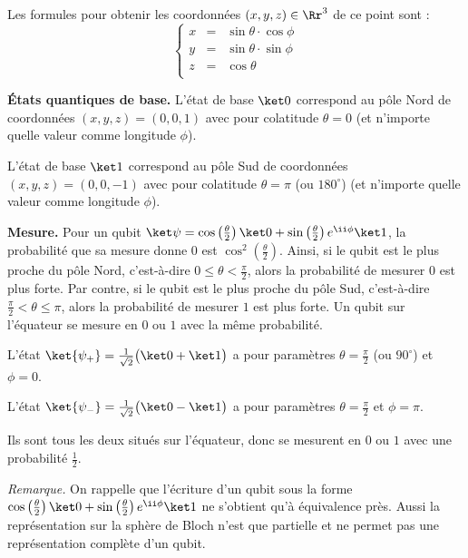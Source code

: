 \documentclass[11pt,class=report,crop=false]{standalone}
\renewcommand{\commentfigure}[1]{#1} %
\begin{document}
Les formules pour obtenir les coordonnées $(x,y,z)\in\Rr^3$ de ce point sont :
$$\left\{\begin{array}{rcl}
x &=& \sin\theta \cdot \cos\phi \\
y &=& \sin\theta \cdot \sin\phi \\
z &=& \cos\theta \\
\end{array}\right.$$


\bigskip
\textbf{États quantiques de base.}
L'état de base $\ket0$ correspond au pôle Nord de coordonnées $(x,y,z)= (0,0,1)$ avec pour colatitude $\theta=0$ (et n'importe quelle valeur comme longitude $\phi$).
 \commentfigure{ 
\myfigure{0.8}{
\tikzinput{bloch02a}\qquad\qquad
\tikzinput{bloch02b}
}  
}
L'état de base $\ket1$ correspond au pôle Sud de coordonnées $(x,y,z)= (0,0,-1)$ avec pour colatitude $\theta=\pi$ (ou $180^\circ$) (et n'importe quelle valeur comme longitude $\phi$).
 
\bigskip
\textbf{Mesure.}
Pour un qubit $\ket\psi = \cos\left(\frac\theta2\right)\ket0+ \sin\left(\frac\theta2\right)e^{\ii\phi}\ket1$, la probabilité que sa mesure donne $0$ est
$\cos^2(\frac\theta2)$. 
Ainsi, si le qubit est le plus proche du pôle Nord, c'est-à-dire $0 \le \theta < \frac\pi2$, alors la probabilité de mesurer $0$ est plus forte.
 Par contre, 
 si le qubit est le plus proche du pôle Sud, c'est-à-dire $\frac\pi2 < \theta \le  \pi$, alors la probabilité de mesurer $1$ est plus forte.
Un qubit sur l'équateur se mesure en $0$ ou $1$ avec la même probabilité.



\begin{exemple}
L'état $\ket{\psi_+} = \frac1{\sqrt2} \big(\ket0+\ket1\big)$ a pour paramètres
$\theta = \frac\pi2$ (ou $90^\circ$) et $\phi=0$. 
  
  
  L'état $\ket{\psi_-} = \frac1{\sqrt2} \big(\ket0-\ket1\big)$ a pour paramètres
   $\theta = \frac\pi2$ et $\phi=\pi$.
    
   \commentfigure{
   }
Ils sont tous les deux situés sur l'équateur, donc se mesurent en $0$ ou $1$ avec une probabilité $\frac12$.
\end{exemple}


\emph{Remarque.} On rappelle que l'écriture d'un qubit sous la forme $ \cos\left(\frac\theta2\right)\ket0+ \sin\left(\frac\theta2\right)e^{\ii\phi}\ket1$ ne s'obtient qu'à équivalence près. Aussi la représentation sur la sphère de Bloch n'est que partielle et ne permet pas une représentation complète d'un qubit.
\end{document}
